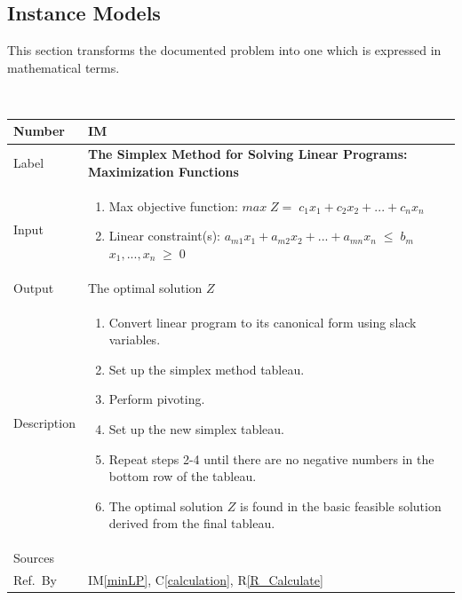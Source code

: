 \documentclass[12pt]{article}
\newcommand{\colAwidth}{0.13\textwidth}
\newcommand{\colBwidth}{0.82\textwidth}
\newcommand{\calcref}[1]{C\ref{#1}}
\newcounter{instnum} %
\newcommand{\iref}[1]{IM\ref{#1}}
\newcommand{\rref}[1]{R\ref{#1}}
\begin{document}
\subsection{Instance Models} \label{sec_instance}   

This section transforms the documented problem into one which is expressed in 
mathematical terms.

~\newline

\noindent
\begin{minipage}{\textwidth}
	\renewcommand*{\arraystretch}{1.5}
	\begin{tabular}{| p{\colAwidth} | p{\colBwidth}|}
		\hline
		\rowcolor[gray]{0.9}
		Number& IM{instnum}\theinstnum \label{maxLP}\\
		\hline
		Label& \bf The Simplex Method for Solving Linear Programs: Maximization 
		Functions\\
		\hline
		Input& 
		\begin{enumerate}
			\item Max objective function: $max\;Z=\;c_{1}x_1 + c_{2}x_2 + ... + 
			c_{n}x_n$
			
			\item Linear constraint(s): 
			\newline$a_{m1}x_1 + a_{m2}x_2 + ... + a_{mn}x_n\;{\leq}\;b_m$
			\newline$x_1, ..., x_n\;{\geq}\;0$
		\end{enumerate}\\
		\hline
		Output& The optimal solution $Z$\\
		\hline
		Description& 
		\begin{enumerate}
			\item Convert linear program to its canonical form using slack 
			variables.
			
			\item Set up the simplex method tableau.
			
			\item Perform pivoting.
			
			\item Set up the new simplex tableau.
			
			\item Repeat steps 2-4 until there are no negative numbers in the 
			bottom row of the tableau.
			
			\item The optimal solution $Z$ is found in the basic feasible 
			solution derived from the final tableau.
		\end{enumerate}
		\\
		\hline
		Sources& \cite{lp-defs}\\
		\hline
		Ref.\ By & \iref{minLP}, \calcref{calculation}, \rref{R_Calculate}\\
		\hline
	\end{tabular}
\end{minipage}\\
\end{document}
